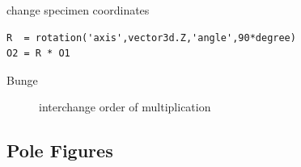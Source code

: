\documentclass[compress]{beamer}
\begin{document}
\begin{frame}
\begin{overlayarea}{\textwidth}{8cm}
  \pause
  \medskip

  change specimen coordinates
  \vspace{-.12cm}
  \begin{lstlisting}[style=input]
R  = rotation('axis',vector3d.Z,'angle',90*degree)
O2 = R * O1
\end{lstlisting}

  \pause
  \medskip

  \begin{alertblock}{}
    \begin{description}
    \item[Bunge] interchange order of multiplication
    \end{description}
  \end{alertblock}

\end{overlayarea}

\end{frame}


\subsection*{Pole Figures}
\end{document}
